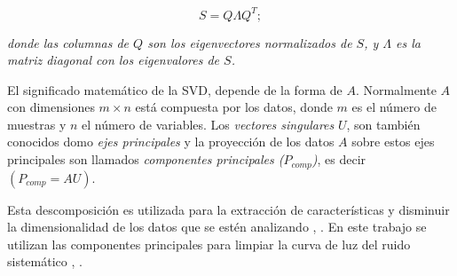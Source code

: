 \begin{equation*}
  \displaystyle S=Q\Lambda Q^{T};
\end{equation*}


\noindent \textit{donde las columnas de $Q$ son los eigenvectores normalizados de $S$, y $\Lambda$ es la matriz diagonal con los eigenvalores de $S$.}

El significado matemático de la SVD, depende de la forma de $A$. Normalmente $A$ con dimensiones $m\times n$ está compuesta por los datos, donde $m$ es el número de muestras y $n$ el número de variables. Los \textit{vectores singulares} $U$, son también conocidos domo \textit{ejes principales} y la proyección de los datos $A$ sobre estos ejes principales son llamados \textit{componentes principales ($P_{comp}$)}, es decir $(P_{comp}=AU)$.

Esta descomposición es utilizada para la extracción de características y disminuir la dimensionalidad de los datos que se estén analizando \cite{mcgurk2010principal}, \cite{medeiros2018principal}. En este trabajo se utilizan las componentes principales para limpiar la curva de luz del ruido sistemático \cite{shin1999iterative}, \cite{bailey2012principal}.